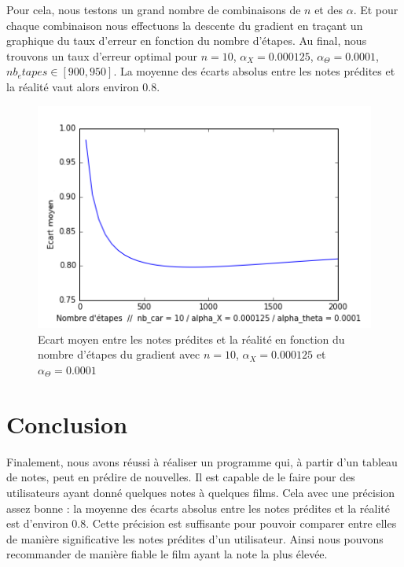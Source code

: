 \documentclass[a4paper,10pt]{article}
\begin{document}
Pour cela, nous testons un grand nombre de combinaisons de $n$ et des $\alpha$. Et pour chaque combinaison nous effectuons la descente du gradient en traçant un graphique du taux d'erreur en fonction du nombre d'étapes.
Au final, nous trouvons un taux d'erreur optimal pour $n = 10$, $\alpha_X = 0.000125$, $\alpha_\Theta = 0.0001$, $nb_etapes \in [900,950]$. La moyenne des écarts absolus entre les notes prédites et la réalité vaut alors environ $0.8$.

\begin{figure}[H]
\centering
\includegraphics[scale=0.5]{yassine.png}
\caption{Ecart moyen entre les notes prédites et la réalité en fonction du nombre d'étapes du gradient avec $n = 10$, $\alpha_X = 0.000125$ et $\alpha_\Theta = 0.0001$}
\end{figure}

\newpage

\section*{Conclusion}
Finalement, nous avons réussi à réaliser un programme qui, à partir d'un tableau de notes, peut en prédire de nouvelles. Il est capable de le faire pour des utilisateurs ayant donné quelques notes à quelques films. Cela avec une précision assez bonne : la moyenne des écarts absolus entre les notes prédites et la réalité est d'environ $0.8$. Cette précision est suffisante pour pouvoir comparer entre elles de manière significative les notes prédites d'un utilisateur. Ainsi nous pouvons recommander de manière fiable le film ayant la note la plus élevée.\\
\end{document}
